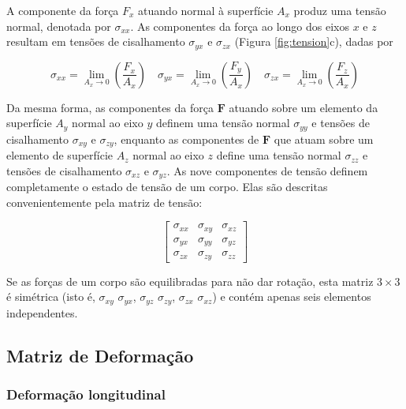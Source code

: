 \documentclass[]{book}
\theoremstyle{definition}
\theoremstyle{definition}
\theoremstyle{definition}
\theoremstyle{remark}
\begin{document}
A componente da força \({F_x}\) atuando normal à superfície \({A_x}\) produz uma tensão normal, denotada por \(\sigma_{xx}\). As componentes da força ao longo dos eixos \(x\) e \(z\) resultam em tensões de cisalhamento \(\sigma_{yx}\) e \(\sigma_{zx}\) (Figura \ref{fig:tension}c), dadas por

\begin{equation}
  \sigma_{xx}= \lim\limits_{A_x \to 0} \left(\frac{F_x}{A_x}\right) \quad
  \sigma_{yx}= \lim\limits_{A_x \to 0} \left(\frac{F_y}{A_x}\right) \quad
  \sigma_{zx}= \lim\limits_{A_x \to 0} \left(\frac{F_z}{A_x}\right) \label{eq:0302}
\end{equation}

Da mesma forma, as componentes da força \(\mathbf{F}\) atuando sobre um elemento da superfície \({A_y}\) normal ao eixo \({y}\) definem uma tensão normal \(\sigma_{yy}\) e tensões de cisalhamento \(\sigma_{xy}\) e \(\sigma_{zy}\), enquanto as componentes de \(\mathbf{F}\) que atuam sobre um elemento de superfície \({A_z}\) normal ao eixo \({z}\) define uma tensão normal \(\sigma_{zz}\) e tensões de cisalhamento \(\sigma_{xz}\) e \(\sigma_{yz}\). As nove componentes de tensão definem completamente o estado de tensão de um corpo. Elas são descritas convenientemente pela matriz de tensão:

\begin{equation}
\left[ \begin{array}{lll}{\sigma_{x x}} & {\sigma_{x y}} & {\sigma_{x z}} \\ {\sigma_{y x}} & {\sigma_{y y}} & {\sigma_{y z}} \\ {\sigma_{z x}} & {\sigma_{z y}} & {\sigma_{z z}}\end{array}\right] \label{eq:0303}
\end{equation}

Se as forças de um corpo são equilibradas para não dar rotação, esta matriz \(3\times 3\) é simétrica (isto é, \(\sigma_{xy}\) \(\sigma_{yx}\), \(\sigma_{yz}\) \(\sigma_{zy}\), \(\sigma_{zx}\) \(\sigma_{xz}\)) e contém apenas seis elementos independentes.

\hypertarget{matriz-de-deformacao}{%
\subsection{Matriz de Deformação}\label{matriz-de-deformacao}}

\hypertarget{deformacao-longitudinal}{%
\subsubsection{Deformação longitudinal}\label{deformacao-longitudinal}}
\end{document}
